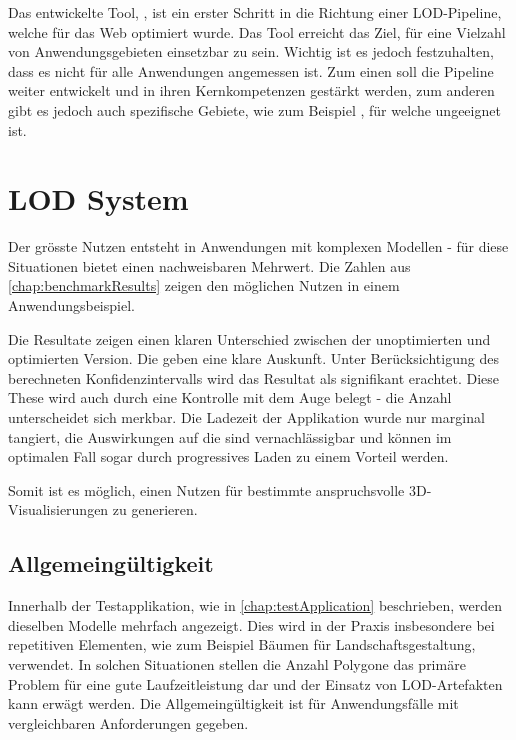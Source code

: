 Das entwickelte Tool, , ist ein erster Schritt in die Richtung einer LOD-Pipeline, welche für das Web optimiert wurde. Das Tool erreicht das Ziel, für eine Vielzahl von Anwendungsgebieten einsetzbar zu sein. Wichtig ist es jedoch festzuhalten, dass es nicht für alle Anwendungen angemessen ist. Zum einen soll die Pipeline weiter entwickelt und in ihren Kernkompetenzen gestärkt werden, zum anderen gibt es jedoch auch spezifische Gebiete, wie zum Beispiel , für welche  ungeeignet ist.

\section{LOD System}

Der grösste Nutzen entsteht in Anwendungen mit komplexen Modellen - für diese Situationen bietet  einen nachweisbaren Mehrwert. Die Zahlen aus \autoref{chap:benchmarkResults} zeigen den möglichen Nutzen in einem Anwendungsbeispiel.

Die Resultate zeigen einen klaren Unterschied zwischen der unoptimierten und optimierten Version. Die  geben eine klare Auskunft. Unter Berücksichtigung des berechneten Konfidenzintervalls wird das Resultat als signifikant erachtet. Diese These wird auch durch eine Kontrolle mit dem Auge belegt - die Anzahl  unterscheidet sich merkbar. Die Ladezeit der Applikation wurde nur marginal tangiert, die Auswirkungen auf die  sind vernachlässigbar und können im optimalen Fall sogar durch progressives Laden zu einem Vorteil werden.

Somit ist es möglich, einen Nutzen für bestimmte anspruchsvolle 3D-Visualisierungen zu generieren.

\subsection{Allgemeingültigkeit}

Innerhalb der Testapplikation, wie in \autoref{chap:testApplication} beschrieben, werden dieselben Modelle mehrfach angezeigt. Dies wird in der Praxis insbesondere bei repetitiven Elementen, wie zum Beispiel Bäumen für Landschaftsgestaltung, verwendet. In solchen Situationen stellen die Anzahl Polygone das primäre Problem für eine gute Laufzeitleistung dar und der Einsatz von LOD-Artefakten kann erwägt werden. Die Allgemeingültigkeit ist für Anwendungsfälle mit vergleichbaren Anforderungen gegeben.

